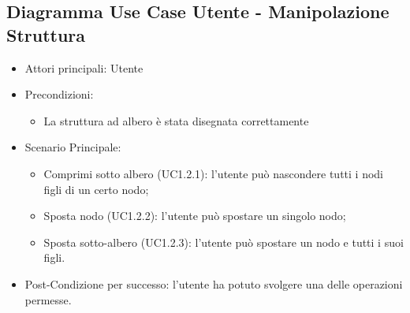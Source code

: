 \subsection{Diagramma Use Case Utente - Manipolazione Struttura}
\begin{itemize}
\item Attori principali: Utente
\item Precondizioni:
\begin{itemize}
\item La struttura ad albero è stata disegnata correttamente
\end{itemize}
\item Scenario Principale:
\begin{itemize}
\item Comprimi sotto albero (UC1.2.1): l'utente può nascondere tutti i nodi figli di un certo nodo;
\item Sposta nodo (UC1.2.2): l'utente può spostare un singolo nodo;
\item Sposta sotto-albero (UC1.2.3): l'utente può spostare un nodo e tutti i suoi figli.
\end{itemize}
\item Post-Condizione per successo: l'utente ha potuto svolgere una delle operazioni permesse.
\end{itemize}
\newpage
